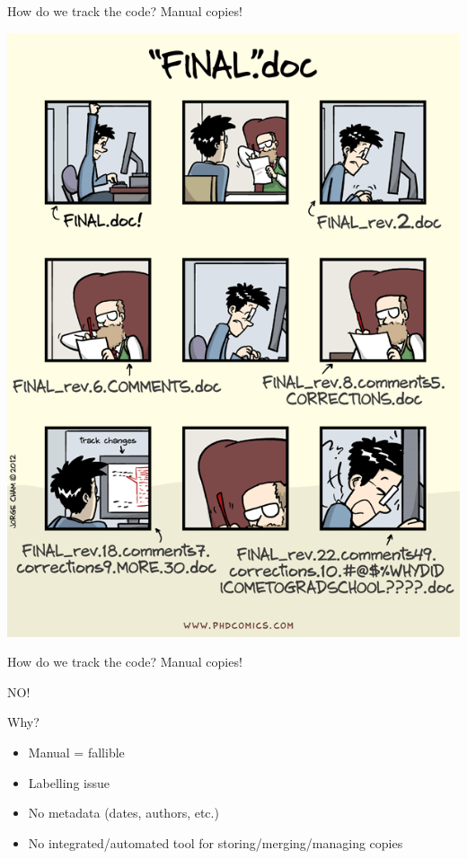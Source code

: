 \begin{frame}[fragile]{How do we track the code? Manual copies!}

\begin{center}
\includegraphics[height=0.89\textheight]{phd101212s}
\end{center}

\end{frame}

\begin{frame}[fragile]{How do we track the code? Manual copies!}

\begin{center}
\Huge NO!
\end{center}

Why?
\begin{itemize}
  \item Manual = fallible
  \item Labelling issue
  \item No metadata (dates, authors, etc.)
  \item No integrated/automated tool for storing/merging/managing copies
\end{itemize}

\end{frame}

